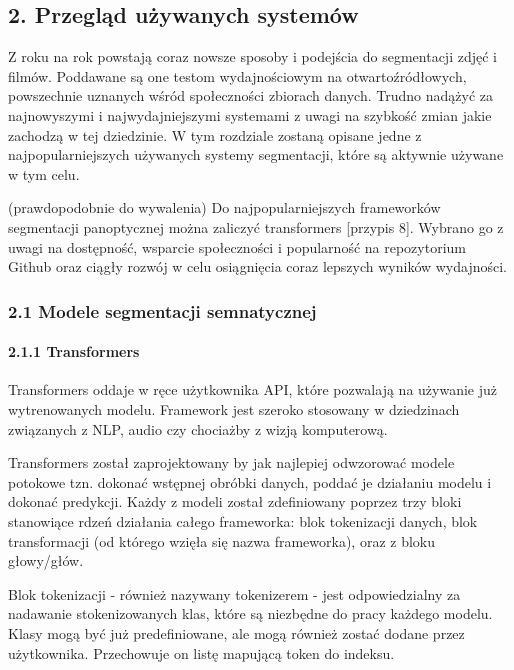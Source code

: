 \documentclass[
]{article}
\begin{document}
\subsection{2. Przegląd używanych systemów}\label{przeglux105d-uux17cywanych-systemuxf3w}

Z roku na rok powstają coraz nowsze sposoby i podejścia do segmentacji zdjęć i filmów. Poddawane są one testom wydajnościowym na otwartoźródłowych, powszechnie uznanych wśród społeczności zbiorach danych. Trudno nadążyć za najnowyszymi i najwydajniejszymi systemami z uwagi na szybkość zmian jakie zachodzą w tej dziedzinie.
W tym rozdziale zostaną opisane jedne z najpopularniejszych używanych systemy segmentacji, które są aktywnie używane w tym celu.

(prawdopodobnie do wywalenia) Do najpopularniejszych frameworków segmentacji panoptycznej można zaliczyć transformers {[}przypis 8{]}. Wybrano go z uwagi na dostępność, wsparcie społeczności i popularność na repozytorium Github oraz ciągły rozwój w celu osiągnięcia coraz lepszych wyników wydajności.

\subsubsection{2.1 Modele segmentacji semnatycznej}\label{modele-segmentacji-semnatycznej}

\paragraph{2.1.1 Transformers}\label{transformers}

Transformers oddaje w ręce użytkownika API, które pozwalają na używanie już wytrenowanych modelu. Framework jest szeroko stosowany w dziedzinach związanych z NLP, audio czy chociażby z wizją komputerową.

Transformers został zaprojektowany by jak najlepiej odwzorować modele potokowe tzn. dokonać wstępnej obróbki danych, poddać je działaniu modelu i dokonać predykcji. Każdy z modeli został zdefiniowany poprzez trzy bloki stanowiące rdzeń działania całego frameworka: blok tokenizacji danych, blok transformacji (od którego wzięła się nazwa frameworka), oraz z bloku głowy/głów.

Blok tokenizacji - również nazywany tokenizerem - jest odpowiedzialny za nadawanie stokenizowanych klas, które są niezbędne do pracy każdego modelu. Klasy mogą być już predefiniowane, ale mogą również zostać dodane przez użytkownika. Przechowuje on listę mapującą token do indeksu.
\end{document}
